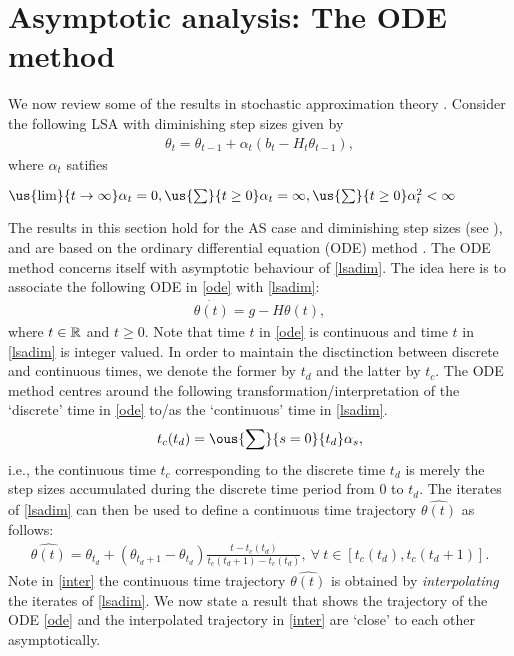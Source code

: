 \section{Asymptotic analysis: The ODE method}
We now review some of the results in stochastic approximation theory \cite{SA}. Consider the following LSA with diminishing step sizes given by
\begin{align}\label{lsadim}
\theta_t=\theta_{t-1}+\alpha_t(b_t-H_t\theta_{t-1}),
\end{align}
where $\alpha_t$ satifies 
\begin{assumption}\label{dimassmp}
$\us{\lim}{t\ra\infty }\alpha_t=0, \us{\sum}{t\geq 0}\alpha_t=\infty, \us{\sum}{t\geq 0}\alpha_t^2<\infty$
\end{assumption}
The results in this section hold for the AS case and diminishing step sizes (see \Cref{} ), and are based on the ordinary differential equation (ODE) method \cite{SA,Kush}. The ODE method concerns itself with asymptotic behaviour of \eqref{lsadim}.
The idea here is to associate the following ODE in \eqref{ode} with \eqref{lsadim}:
\begin{align}\label{ode}
\dot{\theta(t)}=g-H\theta(t),
\end{align}
where $t\in\mathbb{R}$ and $t\geq 0$. Note that time $t$ in \eqref{ode} is continuous and time $t$ in \eqref{lsadim} is integer valued. In order to maintain the disctinction between discrete and continuous times, we denote the former by $t_d$ and the latter by $t_c$.
The ODE method centres around the following transformation/interpretation of the `discrete' time in \eqref{ode} to/as the `continuous' time in \eqref{lsadim}.
\begin{align}\label{stepacc}
t_c(t_d)=\ous{\sum}{s=0}{t_d}\alpha_s,
\end{align}
i.e., the continuous time $t_c$ corresponding to the discrete time $t_d$ is merely the step sizes accumulated during the discrete time period from $0$ to $t_d$. The iterates of \eqref{lsadim} can then be used to define a continuous time trajectory $\hat{\theta(t)}$ as follows:
\begin{align}\label{inter}
\hat{\theta(t)}=\theta_{t_d}+(\theta_{t_d+1}-\theta_{t_d})\frac{t-t_c(t_d) }{t_c(t_d+1)-t_c(t_d)}, ~\forall~t\in[t_c(t_d),t_c(t_d+1)].
\end{align}
Note in \eqref{inter} the continuous time trajectory $\hat{\theta(t)}$ is obtained by \emph{interpolating} the iterates of \eqref{lsadim}.
We now state a result that shows the trajectory of the ODE \eqref{ode} and the interpolated trajectory in \eqref{inter} are `close' to each other asymptotically.
